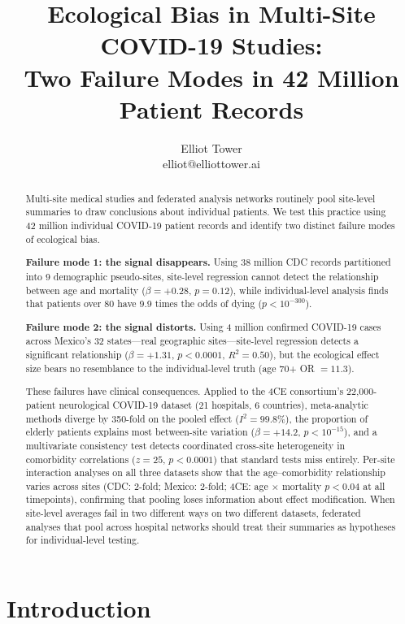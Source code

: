 \documentclass{article}
\title{Ecological Bias in Multi-Site COVID-19 Studies:\\Two Failure Modes in 42 Million Patient Records}
\author{\name Elliot Tower \\
      \email elliot@elliottower.ai}
\begin{document}
\maketitle

\begin{abstract}
Multi-site medical studies and federated analysis networks routinely pool
site-level summaries to draw conclusions about individual patients.  We test
this practice using 42 million individual COVID-19 patient records and
identify two distinct failure modes of ecological bias.

\textbf{Failure mode 1: the signal disappears.}  Using 38 million CDC
records partitioned into 9 demographic pseudo-sites, site-level regression
cannot detect the relationship between age and mortality ($\beta = +0.28$,
$p = 0.12$), while individual-level analysis finds that patients over 80
have 9.9 times the odds of dying ($p < 10^{-300}$).

\textbf{Failure mode 2: the signal distorts.}  Using 4 million confirmed
COVID-19 cases across Mexico's 32 states---real geographic sites---site-level
regression detects a significant relationship ($\beta = +1.31$,
$p < 0.0001$, $R^2 = 0.50$), but the ecological effect size bears no
resemblance to the individual-level truth (age 70+ OR $= 11.3$).

These failures have clinical consequences.  Applied to the 4CE consortium's
22,000-patient neurological COVID-19 dataset (21 hospitals, 6 countries),
meta-analytic methods diverge by 350-fold on the pooled effect
($I^2 = 99.8\%$), the proportion of elderly patients explains most
between-site variation ($\beta = +14.2$, $p < 10^{-15}$), and a
multivariate consistency test detects coordinated cross-site heterogeneity
in comorbidity correlations ($z = 25$, $p < 0.0001$) that standard tests
miss entirely.  Per-site interaction analyses on all three datasets
show that the age--comorbidity relationship varies across sites (CDC:
2-fold; Mexico: 2-fold; 4CE: age $\times$ mortality $p < 0.04$ at all
timepoints), confirming that pooling loses information about effect
modification.  When site-level averages fail in two different ways on two
different datasets, federated analyses that pool across hospital networks
should treat their summaries as hypotheses for individual-level testing.
\end{abstract}


\section{Introduction}
\end{document}
